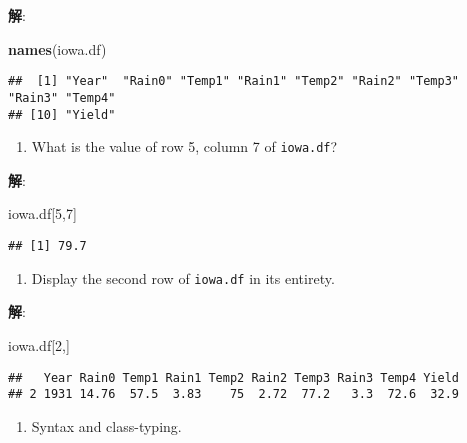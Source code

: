 \documentclass[
]{article}
\newenvironment{Shaded}{\begin{snugshade}}{\end{snugshade}}
\newcommand{\DecValTok}[1]{\textcolor[rgb]{0.00,0.00,0.81}{#1}}
\newcommand{\KeywordTok}[1]{\textcolor[rgb]{0.13,0.29,0.53}{\textbf{#1}}}
\newcommand{\NormalTok}[1]{#1}
\providecommand{\tightlist}{%
  \setlength{\itemsep}{0pt}\setlength{\parskip}{0pt}}
\begin{document}
\textbf{解}:

\begin{Shaded}
\begin{Highlighting}[]
\KeywordTok{names}\NormalTok{(iowa.df)}
\end{Highlighting}
\end{Shaded}

\begin{verbatim}
##  [1] "Year"  "Rain0" "Temp1" "Rain1" "Temp2" "Rain2" "Temp3" "Rain3" "Temp4"
## [10] "Yield"
\end{verbatim}

\begin{enumerate}
\def\labelenumi{\alph{enumi}.}
\setcounter{enumi}{3}
\tightlist
\item
  What is the value of row 5, column 7 of \texttt{iowa.df}?
\end{enumerate}

\textbf{解}:

\begin{Shaded}
\begin{Highlighting}[]
\NormalTok{iowa.df[}\DecValTok{5}\NormalTok{,}\DecValTok{7}\NormalTok{]}
\end{Highlighting}
\end{Shaded}

\begin{verbatim}
## [1] 79.7
\end{verbatim}

\begin{enumerate}
\def\labelenumi{\alph{enumi}.}
\setcounter{enumi}{4}
\tightlist
\item
  Display the second row of \texttt{iowa.df} in its entirety.
\end{enumerate}

\textbf{解}:

\begin{Shaded}
\begin{Highlighting}[]
\NormalTok{iowa.df[}\DecValTok{2}\NormalTok{,]}
\end{Highlighting}
\end{Shaded}

\begin{verbatim}
##   Year Rain0 Temp1 Rain1 Temp2 Rain2 Temp3 Rain3 Temp4 Yield
## 2 1931 14.76  57.5  3.83    75  2.72  77.2   3.3  72.6  32.9
\end{verbatim}

\begin{enumerate}
\def\labelenumi{\arabic{enumi}.}
\setcounter{enumi}{1}
\tightlist
\item
  Syntax and class-typing.
\end{enumerate}
\end{document}
